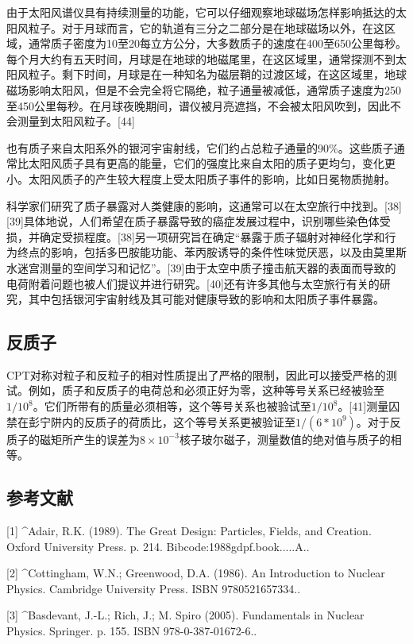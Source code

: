 由于太阳风谱仪具有持续测量的功能，它可以仔细观察地球磁场怎样影响抵达的太阳风粒子。对于月球而言，它的轨道有三分之二部分是在地球磁场以外，在这区域，通常质子密度为10至20每立方公分，大多数质子的速度在400至650公里每秒。每个月大约有五天时间，月球是在地球的地磁尾里，在这区域里，通常探测不到太阳风粒子。剩下时间，月球是在一种知名为磁层鞘的过渡区域，在这区域里，地球磁场影响太阳风，但是不会完全将它隔绝，粒子通量被减低，通常质子速度为250至450公里每秒。在月球夜晚期间，谱仪被月亮遮挡，不会被太阳风吹到，因此不会测量到太阳风粒子。[44]

也有质子来自太阳系外的银河宇宙射线，它们约占总粒子通量的90\%。这些质子通常比太阳风质子具有更高的能量，它们的强度比来自太阳的质子更均匀，变化更小。太阳风质子的产生较大程度上受太阳质子事件的影响，比如日冕物质抛射。

科学家们研究了质子暴露对人类健康的影响，这通常可以在太空旅行中找到。[38][39]具体地说，人们希望在质子暴露导致的癌症发展过程中，识别哪些染色体受损，并确定受损程度。[38]另一项研究旨在确定“暴露于质子辐射对神经化学和行为终点的影响，包括多巴胺能功能、苯丙胺诱导的条件性味觉厌恶，以及由莫里斯水迷宫测量的空间学习和记忆”。[39]由于太空中质子撞击航天器的表面而导致的电荷附着问题也被人们提议并进行研究。[40]还有许多其他与太空旅行有关的研究，其中包括银河宇宙射线及其可能对健康导致的影响和太阳质子事件暴露。

\subsection{ 反质子}
CPT对称对粒子和反粒子的相对性质提出了严格的限制，因此可以接受严格的测试。例如，质子和反质子的电荷总和必须正好为零，这种等号关系已经被验至$1/10^{8}$。它们所带有的质量必须相等，这个等号关系也被验试至$1/10^{8}$。[41]测量囚禁在彭宁阱内的反质子的荷质比，这个等号关系更被验证至$1/(6*10^9)$。对于反质子的磁矩所产生的误差为$8\times10^{-3}$核子玻尔磁子，测量数值的绝对值与质子的相等。

\subsection{参考文献}
[1]
^Adair, R.K. (1989). The Great Design: Particles, Fields, and Creation. Oxford University Press. p. 214. Bibcode:1988gdpf.book.....A..

[2]
^Cottingham, W.N.; Greenwood, D.A. (1986). An Introduction to Nuclear Physics. Cambridge University Press. ISBN 9780521657334..

[3]
^Basdevant, J.-L.; Rich, J.; M. Spiro (2005). Fundamentals in Nuclear Physics. Springer. p. 155. ISBN 978-0-387-01672-6..

